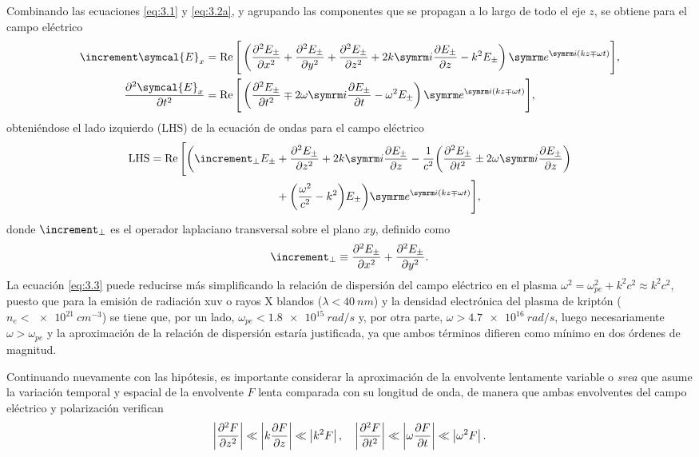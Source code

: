 Combinando las ecuaciones \eqref{eq:3.1} y \eqref{eq:3.2a}, y agrupando las componentes que se propagan a lo largo de todo el eje $z$, se obtiene para el campo eléctrico
\begin{align}
  \laplacian \symcal{E}_{x} 
  &= 
  \RE \Bigg[\left(\pdvN{E_{\pm }}{x}{2} + \pdvN{E_{\pm }}{y}{2} + \pdvN{E_{\pm }}{z}{2} + 2k \iu \pdv{E_{\pm }}{z} - k^{2}E_{\pm }\right)\eu^{\iu (kz \mp \omega t)}\Bigg], \\
  \pdvN{\symcal{E}_{x}}{t}{2}
  &= 
  \RE \Bigg[\left(\pdvN{E_{\pm }}{t}{2} \mp 2 \omega \iu \pdv{E_{\pm }}{t} - \omega^{2}E_{\pm }\right)\eu^{\iu (kz \mp \omega t)}\Bigg],
\end{align}
obteniéndose el lado izquierdo ($\mathrm{LHS}$) de la ecuación de ondas para el campo eléctrico
\begin{equation}\label{eq:3.3}
  \begin{split}
    \mathrm{LHS} = \RE \Bigg[\bigg(\laplacian_{\perp}E_{\pm} &+ \pdvN{E_{\pm }}{z}{2} + 2k \iu \pdv{E_{\pm }}{z} - \frac{1}{c^{2}}\bigg(\pdvN{E_{\pm }}{t}{2} \pm 2 \omega \iu \pdv{E_{\pm }}{z}\bigg) \\ &+  \bigg(\frac{\omega^{2}}{c^{2}} - k^{2}\bigg)E_{\pm }\bigg)\eu^{\iu(kz \mp \omega t)}\Bigg],
  \end{split}
\end{equation}
donde $\laplacian_{\perp}$ es el operador laplaciano transversal sobre el plano $xy$, definido como
\begin{equation*}
    \laplacian_{\perp} \equiv \pdvN{E_{\pm }}{x}{2} + \pdvN{E_{\pm }}{y}{2}.
\end{equation*}
La ecuación \eqref{eq:3.3} puede reducirse más simplificando la relación de dispersión del campo eléctrico en el plasma $\omega^{2} = \omega^{2}_{pe} + k^{2}c^{2}\approx k^{2}c^{2}$, puesto que para la emisión de radiación \acrshort{xuv} o rayos X blandos ($\lambda<\qty{40}{nm}$) y la densidad electrónica del plasma de kriptón ($n_e<\qty{e21}{cm^{-3}}$) se tiene que, por un lado, $\omega_{pe}<\qty{1,8e15}{rad/s}$ y, por otra parte, $\omega>\qty{4,7e16}{rad/s}$, luego necesariamente $\omega>\omega_{pe}$ y la aproximación de la relación de dispersión estaría justificada, ya que ambos términos difieren como mínimo en dos órdenes de magnitud. 

Continuando nuevamente con las hipótesis, es importante considerar la aproximación de la envolvente lentamente variable o \emph{\acrfull{svea}} que asume la variación temporal y espacial de la envolvente $F$ lenta\autocite{Larroche2000} comparada con su longitud de onda, de manera que ambas envolventes del campo eléctrico y polarización verifican
\begin{equation}\label{eq:3.4}
  \left|\frac{\partial^{2}F}{\partial{z}^{2}}\right| \ll \left|k \frac{\partial F}{\partial z}\right| \ll \left|k^{2} F\right|, \quad 
  \left|\frac{\partial^{2}F}{\partial{t}^{2}}\right| \ll \left|\omega \frac{\partial F}{\partial t}\right| \ll \left|\omega^{2} F\right|.
\end{equation}

